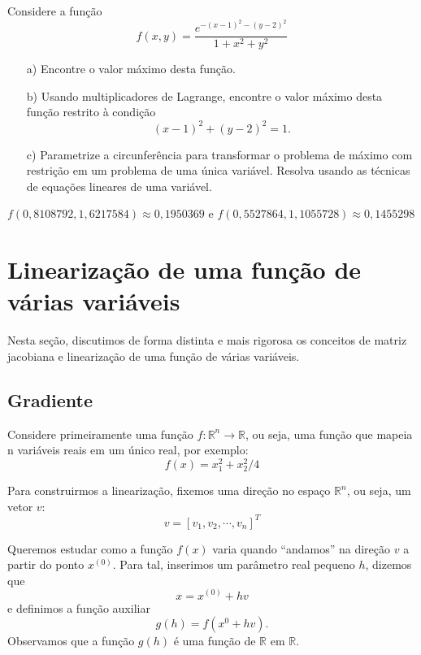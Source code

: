 \begin{exer} Considere a função
\begin{equation} f(x,y)=\frac{e^{-(x-1)^2-(y-2)^2}}{1+x^2+y^2} \end{equation}
\begin{itemize}
\item[a)] Encontre o valor máximo desta função.
\item[b)] Usando multiplicadores de Lagrange, encontre o valor máximo desta função restrito à condição \begin{equation} (x-1)^2+(y-2)^2=1. \end{equation}
\item[c)] Parametrize a circunferência para transformar o problema de máximo com restrição em um problema de uma única variável. Resolva usando as técnicas de equações lineares de uma variável.
\end{itemize}
\end{exer}
\begin{resp}
$f(0,8108792, 1,6217584)\approx 0,1950369$ e $f(0,5527864, 1,1055728 )\approx 0,1455298 $
\end{resp}

\section{Linearização de uma função de várias variáveis}
Nesta seção, discutimos de forma distinta e mais rigorosa os conceitos de matriz jacobiana e linearização de uma função de várias variáveis.
\subsection{Gradiente}

Considere primeiramente uma função $f:\mathbb{R}^n\to \mathbb{R}$, ou seja, uma função que mapeia n variáveis reais em um único real, por exemplo:
\begin{equation} f(x)=x_1^2+x_2^2/4 \end{equation}

Para construirmos a linearização, fixemos uma direção no espaço $\mathbb{R}^n$, ou seja, um vetor $v$:
\begin{equation} v=[v_1,  v_2,  \cdots,  v_n]^T \end{equation}

Queremos estudar como a função $f(x)$ varia quando ``andamos'' na direção $v$ a partir do ponto $x^{(0)}$. Para tal, inserimos um parâmetro  real pequeno $h$, dizemos que \begin{equation} x=x^{(0)}+hv \end{equation} e definimos a função auxiliar
\begin{equation} g(h)=f(x^{0}+hv). \end{equation}
Observamos que a função $g(h)$ é uma função de $\mathbb{R}$ em $\mathbb{R}$.

